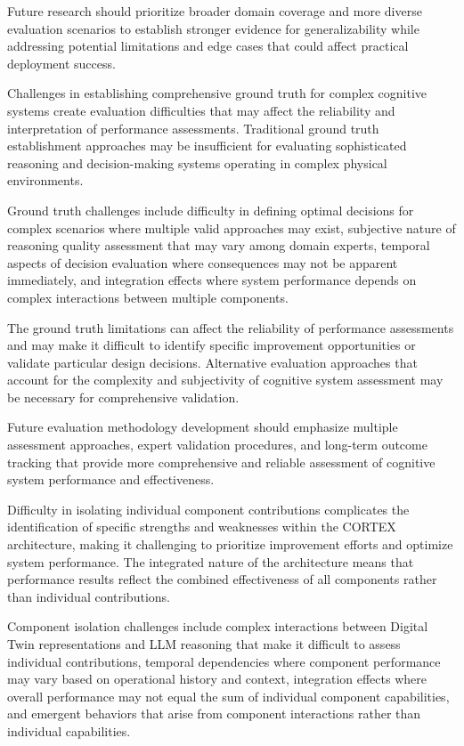 Future research should prioritize broader domain coverage and more diverse evaluation scenarios to establish stronger evidence for generalizability while addressing potential limitations and edge cases that could affect practical deployment success.

Challenges in establishing comprehensive ground truth for complex cognitive systems create evaluation difficulties that may affect the reliability and interpretation of performance assessments. Traditional ground truth establishment approaches may be insufficient for evaluating sophisticated reasoning and decision-making systems operating in complex physical environments.

Ground truth challenges include difficulty in defining optimal decisions for complex scenarios where multiple valid approaches may exist, subjective nature of reasoning quality assessment that may vary among domain experts, temporal aspects of decision evaluation where consequences may not be apparent immediately, and integration effects where system performance depends on complex interactions between multiple components.

The ground truth limitations can affect the reliability of performance assessments and may make it difficult to identify specific improvement opportunities or validate particular design decisions. Alternative evaluation approaches that account for the complexity and subjectivity of cognitive system assessment may be necessary for comprehensive validation.

Future evaluation methodology development should emphasize multiple assessment approaches, expert validation procedures, and long-term outcome tracking that provide more comprehensive and reliable assessment of cognitive system performance and effectiveness.

Difficulty in isolating individual component contributions complicates the identification of specific strengths and weaknesses within the CORTEX architecture, making it challenging to prioritize improvement efforts and optimize system performance. The integrated nature of the architecture means that performance results reflect the combined effectiveness of all components rather than individual contributions.

Component isolation challenges include complex interactions between Digital Twin representations and LLM reasoning that make it difficult to assess individual contributions, temporal dependencies where component performance may vary based on operational history and context, integration effects where overall performance may not equal the sum of individual component capabilities, and emergent behaviors that arise from component interactions rather than individual capabilities.

